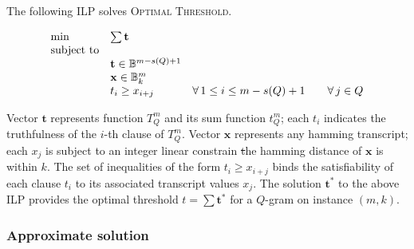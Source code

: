 The following ILP solves \textsc{Optimal Threshold}.

\begin{equation}
\begin{array}{lll}
\text{min} & \sum \mathbf{t}					\\
\text{subject to}						\\
& \mathbf{t} \in \mathbb {B}^{m - s(Q) + 1}		\\
& \mathbf{x} \in \mathbb {B}^m_k				\\
& t_i \geq x_{i+j} 						& \forall \, 1 \leq i \leq m-s(Q)+1 \quad \quad \forall \, j \in Q \\
\end{array}
\end{equation}

Vector $\mathbf{t}$ represents function $T_{Q}^{m}$ and its sum function $t_{Q}^{m}$; each $t_i$ indicates the truthfulness of the $i$-th clause of $T_{Q}^{m}$.
Vector $\mathbf{x}$ represents any hamming transcript; each $x_j$ is subject to an integer linear constrain \st the hamming distance of $\mathbf{x}$ is within $k$.
The set of inequalities of the form $t_i \geq x_{i+j}$ binds the satisfiability of each clause $t_i$ to its associated transcript values $x_j$.
The solution $\mathbf{t}^*$ to the above ILP provides the optimal threshold $t=\sum \mathbf{t}^*$ for a $Q$-gram on instance $(m,k)$.

\subsubsection{Approximate solution}

